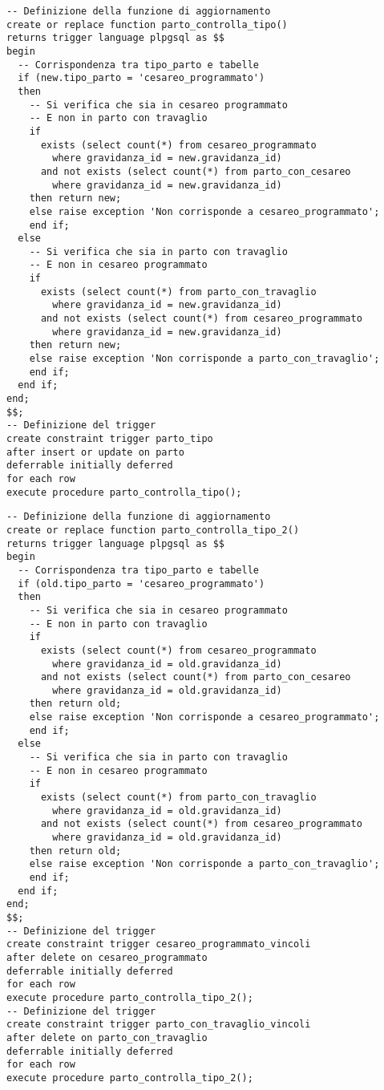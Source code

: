\begin{lstlisting}[float,caption={Definizione del \emph{trigger} \tab{parto\_tipo}.},label=ptrgpartotipo]
-- Definizione della funzione di aggiornamento
create or replace function parto_controlla_tipo()
returns trigger language plpgsql as $$
begin
  -- Corrispondenza tra tipo_parto e tabelle
  if (new.tipo_parto = 'cesareo_programmato')
  then
    -- Si verifica che sia in cesareo programmato
    -- E non in parto con travaglio
    if
      exists (select count(*) from cesareo_programmato
        where gravidanza_id = new.gravidanza_id)
      and not exists (select count(*) from parto_con_cesareo
        where gravidanza_id = new.gravidanza_id)
    then return new;
    else raise exception 'Non corrisponde a cesareo_programmato';
    end if;
  else
    -- Si verifica che sia in parto con travaglio
    -- E non in cesareo programmato
    if
      exists (select count(*) from parto_con_travaglio
        where gravidanza_id = new.gravidanza_id)
      and not exists (select count(*) from cesareo_programmato
        where gravidanza_id = new.gravidanza_id)
    then return new;
    else raise exception 'Non corrisponde a parto_con_travaglio';
    end if;
  end if;
end;
$$;
-- Definizione del trigger
create constraint trigger parto_tipo
after insert or update on parto
deferrable initially deferred
for each row
execute procedure parto_controlla_tipo();
\end{lstlisting}

\begin{lstlisting}[float,caption={Definizione dei \emph{trigger} \tab{cesareo\_programmato\_vincoli} e \tab{parto\_con\_travaglio\_vincoli}.},label=ptrgcesareovincoli]
-- Definizione della funzione di aggiornamento
create or replace function parto_controlla_tipo_2()
returns trigger language plpgsql as $$
begin
  -- Corrispondenza tra tipo_parto e tabelle
  if (old.tipo_parto = 'cesareo_programmato')
  then
    -- Si verifica che sia in cesareo programmato
    -- E non in parto con travaglio
    if
      exists (select count(*) from cesareo_programmato
        where gravidanza_id = old.gravidanza_id)
      and not exists (select count(*) from parto_con_cesareo
        where gravidanza_id = old.gravidanza_id)
    then return old;
    else raise exception 'Non corrisponde a cesareo_programmato';
    end if;
  else
    -- Si verifica che sia in parto con travaglio
    -- E non in cesareo programmato
    if
      exists (select count(*) from parto_con_travaglio
        where gravidanza_id = old.gravidanza_id)
      and not exists (select count(*) from cesareo_programmato
        where gravidanza_id = old.gravidanza_id)
    then return old;
    else raise exception 'Non corrisponde a parto_con_travaglio';
    end if;
  end if;
end;
$$;
-- Definizione del trigger
create constraint trigger cesareo_programmato_vincoli
after delete on cesareo_programmato
deferrable initially deferred
for each row
execute procedure parto_controlla_tipo_2();
-- Definizione del trigger
create constraint trigger parto_con_travaglio_vincoli
after delete on parto_con_travaglio
deferrable initially deferred
for each row
execute procedure parto_controlla_tipo_2();
\end{lstlisting}

